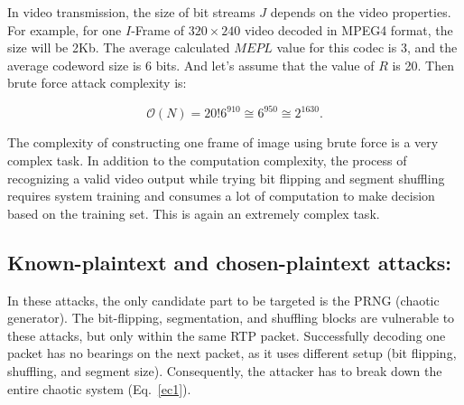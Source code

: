\documentclass[preprint]{elsarticle}
\begin{document}
In video transmission, the size of bit streams $J$ depends on the video properties. For example, for one $I$-Frame of $320 \times 240$ video decoded in MPEG4 format, the size will be 2Kb. The average calculated $MEPL$ value for this codec is 3, and the average codeword size is 6 bits. And let's assume that the value of $R$ is 20. Then brute force attack complexity is:

\begin{equation}
\mathcal{O}(N) = 20!6^{910}  \cong 6^{950} \cong 2^{1630}.
\label{ec13}
\end{equation}

The complexity of constructing one frame of image using brute force is a very complex task. In addition to the computation complexity, the process of recognizing a valid video output while trying bit flipping and segment shuffling requires system training and consumes a lot of computation to make decision based on the training set. This is again an extremely complex task. 

\subsection{Known-plaintext and chosen-plaintext attacks:}

In these attacks, the only candidate part to be targeted is the PRNG (chaotic generator). The bit-flipping, segmentation, and shuffling blocks are vulnerable to these attacks, but only within the same RTP packet. Successfully decoding one packet has no bearings on the next packet, as it uses different setup (bit flipping, shuffling, and segment size). Consequently, the attacker has to break down the entire chaotic system (Eq.~\ref{ec1}).  

\begin{table}[!ht]
\centering
{}
\caption{Specifications of different platforms used in experiments.}
\label{table2}
\end{table}
\end{document}
